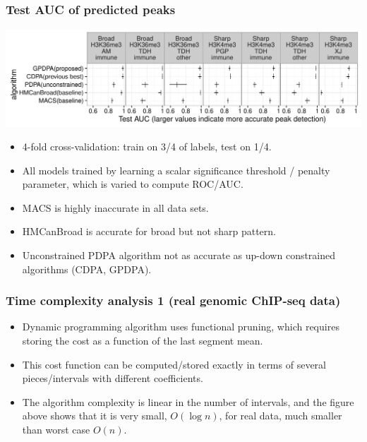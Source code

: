 \documentclass[t]{beamer}
\begin{document}
\begin{frame}
  \frametitle{Test AUC of predicted peaks}
  \includegraphics[width=\textwidth]{figure-test-error-dots}
  \begin{itemize}
  \item 4-fold cross-validation: train on 3/4 of labels, test on 1/4.
  \item All models trained by learning a scalar significance
    threshold / penalty parameter, which is varied to compute ROC/AUC.
  \item MACS is highly inaccurate in all data sets.
  \item HMCanBroad is accurate for broad but not sharp pattern.
  \item Unconstrained PDPA algorithm not as accurate as up-down
    constrained algorithms (CDPA, GPDPA).
  \end{itemize}
  \scriptsize
\end{frame}


\begin{frame}
  \frametitle{Time complexity analysis 1 (real genomic ChIP-seq data)}
  
  

  \begin{itemize}
  \item Dynamic programming algorithm uses functional pruning, which
    requires storing the cost as a function of the last segment mean.
  \item This cost function can be computed/stored exactly in terms of
    several pieces/intervals with different coefficients.
  \item The algorithm complexity is linear in the number of intervals,
    and the figure above shows that it is very small, $O(\log n)$, for
    real data, much smaller than worst case $O(n)$.
  \end{itemize}

\end{frame}
\end{document}
